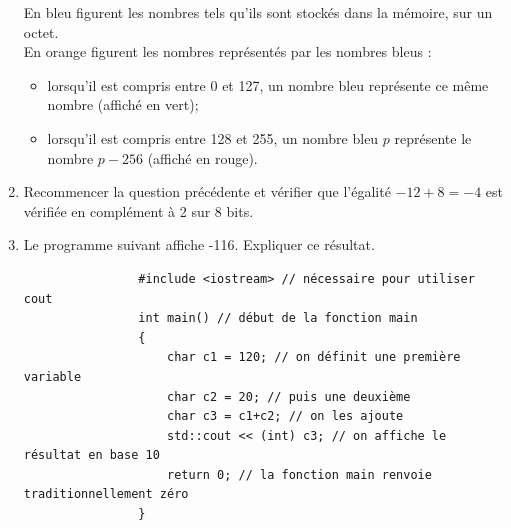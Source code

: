 \begin{exercice}
\begin{enumerate}
              En bleu figurent les nombres tels qu'ils sont stockés dans la mémoire, sur un octet.\\
              En orange figurent les nombres représentés par les nombres bleus :
              \begin{itemize}
                  \item 	lorsqu'il est compris entre 0 et 127, un nombre bleu représente ce même nombre (affiché en vert);
                  \item 	lorsqu'il est compris entre 128 et 255, un nombre bleu $p$ représente le nombre $p-256$ (affiché en rouge).
              \end{itemize}
        \item  Recommencer la question précédente et vérifier que l'égalité $-12+8=-4$ est vérifiée en complément à 2 sur 8 bits.\\
        \item Le programme suivant affiche -116. Expliquer ce résultat.
              \begin{verbatim}
                #include <iostream> // nécessaire pour utiliser cout
                int main() // début de la fonction main
                {
                    char c1 = 120; // on définit une première variable
                    char c2 = 20; // puis une deuxième
                    char c3 = c1+c2; // on les ajoute
                    std::cout << (int) c3; // on affiche le résultat en base 10
                    return 0; // la fonction main renvoie traditionnellement zéro
                }
            \end{verbatim}
    \end{enumerate}
\end{exercice}





